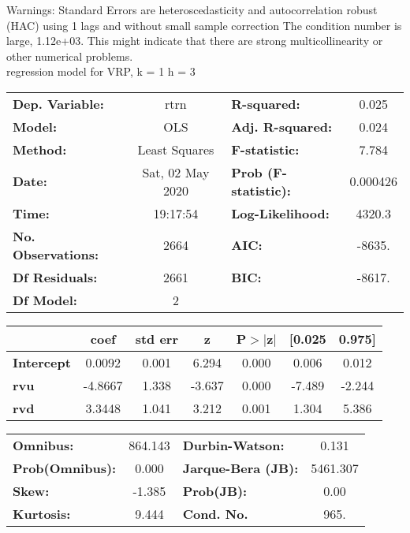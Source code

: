 Warnings: \newline
 [1] Standard Errors are heteroscedasticity and autocorrelation robust (HAC) using 1 lags and without small sample correction \newline
 [2] The condition number is large, 1.12e+03. This might indicate that there are \newline
 strong multicollinearity or other numerical problems.\\ 

regression model for VRP, k = 1 h = 3\begin{center}
\begin{tabular}{lclc}
\toprule
\textbf{Dep. Variable:}    &       rtrn       & \textbf{  R-squared:         } &     0.025   \\
\textbf{Model:}            &       OLS        & \textbf{  Adj. R-squared:    } &     0.024   \\
\textbf{Method:}           &  Least Squares   & \textbf{  F-statistic:       } &     7.784   \\
\textbf{Date:}             & Sat, 02 May 2020 & \textbf{  Prob (F-statistic):} &  0.000426   \\
\textbf{Time:}             &     19:17:54     & \textbf{  Log-Likelihood:    } &    4320.3   \\
\textbf{No. Observations:} &        2664      & \textbf{  AIC:               } &    -8635.   \\
\textbf{Df Residuals:}     &        2661      & \textbf{  BIC:               } &    -8617.   \\
\textbf{Df Model:}         &           2      & \textbf{                     } &             \\
\bottomrule
\end{tabular}
\begin{tabular}{lcccccc}
                   & \textbf{coef} & \textbf{std err} & \textbf{z} & \textbf{P$> |$z$|$} & \textbf{[0.025} & \textbf{0.975]}  \\
\midrule
\textbf{Intercept} &       0.0092  &        0.001     &     6.294  &         0.000        &        0.006    &        0.012     \\
\textbf{rvu}       &      -4.8667  &        1.338     &    -3.637  &         0.000        &       -7.489    &       -2.244     \\
\textbf{rvd}       &       3.3448  &        1.041     &     3.212  &         0.001        &        1.304    &        5.386     \\
\bottomrule
\end{tabular}
\begin{tabular}{lclc}
\textbf{Omnibus:}       & 864.143 & \textbf{  Durbin-Watson:     } &    0.131  \\
\textbf{Prob(Omnibus):} &   0.000 & \textbf{  Jarque-Bera (JB):  } & 5461.307  \\
\textbf{Skew:}          &  -1.385 & \textbf{  Prob(JB):          } &     0.00  \\
\textbf{Kurtosis:}      &   9.444 & \textbf{  Cond. No.          } &     965.  \\
\bottomrule
\end{tabular}
\end{center}

